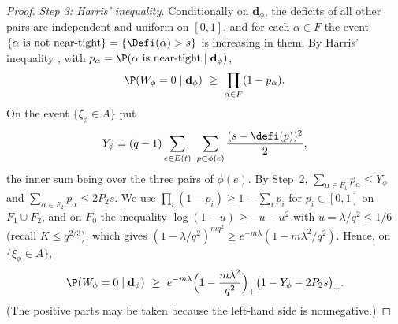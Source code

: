 \begin{proof}
\emph{Step 3: Harris' inequality.} Conditionally on $\mathbf d_\phi$, the deficits of all
other pairs are independent and uniform on $[0,1]$, and for each $\alpha\in F$ the event
$\{\alpha\text{ is not near-tight}\}=\{\Defi(\alpha)>s\}$ is increasing in them. By Harris'
inequality \cite{Harris60}, with $p_\alpha=\P(\alpha\text{ is near-tight}\mid\mathbf d_\phi)$,
\[
\P(W_\phi=0\mid\mathbf d_\phi)\ \ge\ \prod_{\alpha\in F}(1-p_\alpha).
\]
On the event $\{\xi_\phi\in A\}$ put
\[
Y_\phi=(q-1)\sum_{e\in E(t)}\ \sum_{p\subset\phi(e)}\frac{(s-\defi(p))^2}{2},
\]
the inner sum being over the three pairs of $\phi(e)$. By Step~2,
$\sum_{\alpha\in F_1}p_\alpha\le Y_\phi$ and $\sum_{\alpha\in F_2}p_\alpha\le2P_2s$. We use
$\prod_i(1-p_i)\ge1-\sum_ip_i$ for $p_i\in[0,1]$ on $F_1\cup F_2$, and on $F_0$ the
inequality $\log(1-u)\ge-u-u^2$ with $u=\lambda/q^2\le1/6$ (recall $K\le q^{2/3}$), which
gives $(1-\lambda/q^2)^{mq^2}\ge e^{-m\lambda}(1-m\lambda^2/q^2)$. Hence, on
$\{\xi_\phi\in A\}$,
\begin{equation}\label{eq:localconv-harris}
\P(W_\phi=0\mid\mathbf d_\phi)\ \ge\ e^{-m\lambda}\Bigl(1-\frac{m\lambda^2}{q^2}\Bigr)_+
\bigl(1-Y_\phi-2P_2s\bigr)_+ .
\end{equation}
(The positive parts may be taken because the left-hand side is nonnegative.)


\end{proof}

